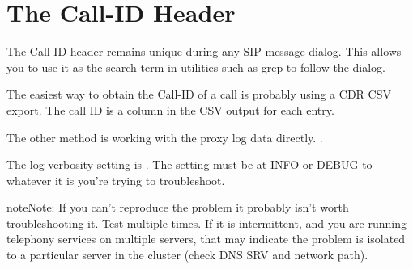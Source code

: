 \documentclass[letterpaper,10pt,english]{sphinxmanual}
\begin{document}
\begin{sphinxVerbatim}[commandchars=\\\{\}]
  
                      

  
                  

    
  
       
     
\end{sphinxVerbatim}


\section{The Call-ID Header}
\label{\detokenize{troubleshooting:the-call-id-header}}
The Call-ID header remains unique during any SIP message dialog. This allows you to use it as the search term in utilities such as grep to follow the dialog.

The easiest way to obtain the Call-ID of a call is probably using a CDR CSV export. The call ID is a column in the CSV output for each entry.

The other method is working with the proxy log data directly. .

The log verbosity setting is . The setting must be at INFO or DEBUG  to whatever it is you’re trying to troubleshoot.

\begin{sphinxadmonition}{note}{Note:}
If you can’t reproduce the problem it probably isn’t worth troubleshooting it. Test multiple times.
If it is intermittent, and you are running telephony services on multiple servers, that may indicate the problem is isolated to a particular server in the cluster (check DNS SRV and network path).
\end{sphinxadmonition}
\end{document}

